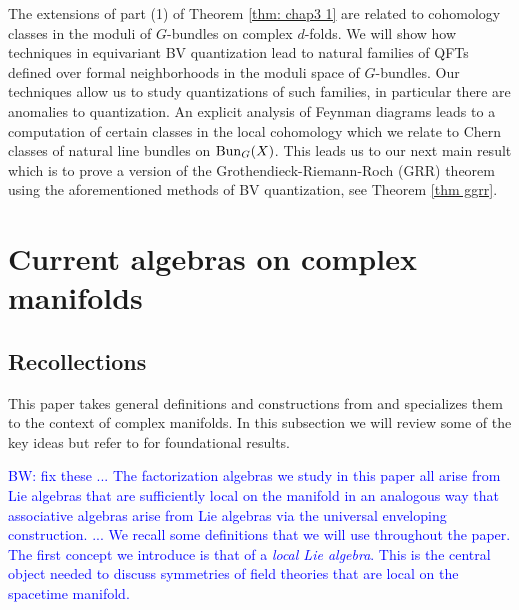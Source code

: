 \documentclass[10pt]{amsart}
\def\brian{\textcolor{blue}{BW: }\textcolor{blue}}
\begin{document}
The extensions of part (1) of Theorem \ref{thm: chap3 1} are related to cohomology classes in the moduli of $G$-bundles on complex $d$-folds.
We will show how techniques in equivariant BV quantization lead to natural families of QFTs defined over formal neighborhoods in the moduli space of $G$-bundles. 
Our techniques allow us to study quantizations of such families, in particular there are anomalies to quantization. 
An explicit analysis of Feynman diagrams leads to a computation of certain classes in the local cohomology which we relate to Chern classes of natural line bundles on ${\rm Bun}_G(X)$.
This leads us to our next main result which is to prove a version of the Grothendieck-Riemann-Roch (GRR) theorem using the aforementioned methods of BV quantization, see Theorem \ref{thm ggrr}.


\section{Current algebras on complex manifolds}

\subsection{Recollections}

This paper takes general definitions and constructions from \cite{CG1} and specializes them to the context of complex manifolds.
In this subsection we will review some of the key ideas but refer to \cite{CG1} for foundational results.

\brian{fix these
...
The factorization algebras we study in this paper all arise from Lie algebras that are sufficiently local on the manifold in an analogous way that associative algebras arise from Lie algebras via the universal enveloping construction.
...
We recall some definitions that we will use throughout the paper.
The first concept we introduce is that of a {\em local Lie algebra}. 
This is the central object needed to discuss symmetries of field theories that are local on the spacetime manifold. 
}
\end{document}
